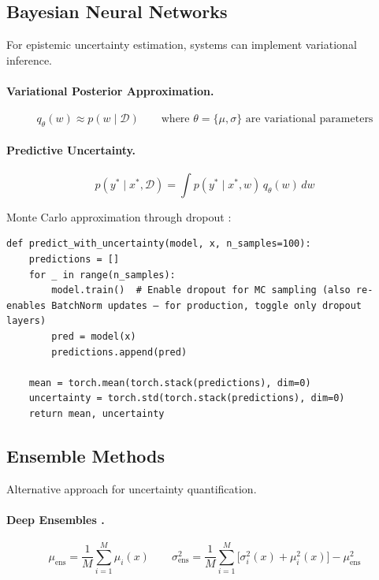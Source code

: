 \subsection{Bayesian Neural Networks}

For epistemic uncertainty estimation, systems can implement variational inference.

\paragraph{Variational Posterior Approximation.}
\[
q_\theta(w) \approx p(w \mid \mathcal{D}) \qquad \text{where } \theta = \{\mu, \sigma\} \text{ are variational parameters}
\]

\paragraph{Predictive Uncertainty.}
\[
p(y^* \mid x^*, \mathcal{D}) = \int p(y^* \mid x^*, w)\, q_\theta(w)\, dw
\]

Monte Carlo approximation through dropout \autocite{gal2016dropout}:

\begin{lstlisting}[style=python, caption={MC Dropout uncertainty estimation}]
def predict_with_uncertainty(model, x, n_samples=100):
    predictions = []
    for _ in range(n_samples):
        model.train()  # Enable dropout for MC sampling (also re-enables BatchNorm updates — for production, toggle only dropout layers)
        pred = model(x)
        predictions.append(pred)

    mean = torch.mean(torch.stack(predictions), dim=0)
    uncertainty = torch.std(torch.stack(predictions), dim=0)
    return mean, uncertainty
\end{lstlisting}

\subsection{Ensemble Methods}

Alternative approach for uncertainty quantification.

\paragraph{Deep Ensembles \autocite{lakshminarayanan2017simple}.}
\[
\mu_{\text{ens}} = \frac{1}{M} \sum_{i=1}^{M} \mu_i(x)
\qquad
\sigma^2_{\text{ens}} = \frac{1}{M} \sum_{i=1}^{M} \bigl[\sigma^2_i(x) + \mu^2_i(x)\bigr] - \mu^2_{\text{ens}}
\]

